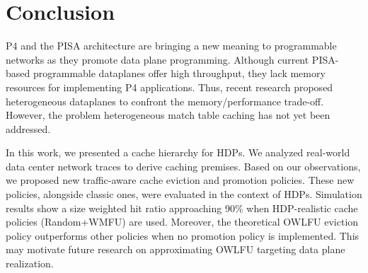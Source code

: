 \section{Conclusion}\label{sec:conclusion}

P4 and the PISA architecture are bringing a new meaning to programmable networks as they promote data plane programming.
Although current PISA-based programmable dataplanes offer high throughput, they lack memory resources for implementing P4 applications.
Thus, recent research proposed heterogeneous dataplanes to confront the memory/performance trade-off.
However, the problem heterogeneous match table caching has not yet been addressed.

In this work, we presented a cache hierarchy for HDPs.
We analyzed real-world data center network traces to derive caching premises.
Based on our observations, we proposed new traffic-aware cache eviction and promotion policies.
These new policies, alongside classic ones, were evaluated in the context of HDPs.
Simulation results show a size weighted hit ratio approaching 90\% when HDP-realistic cache policies (Random+WMFU) are used.
Moreover, the theoretical OWLFU eviction policy outperforms other policies when no promotion policy is implemented.
This may motivate future research on approximating OWLFU targeting data plane realization.